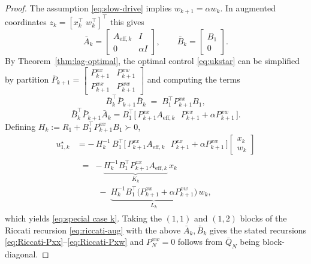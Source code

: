 \documentclass[letterpaper, 10 pt, conference]{ieeeconf}  %
\begin{document}
\begin{proof}
The assumption \eqref{eq:slow-drive} implies $w_{k+1}=\alpha w_k$. In augmented coordinates
$z_k=[x_k^\top \; w_k^\top]^\top$ this gives
\[
\bar A_k=\begin{bmatrix}A_{\mathrm{eff},k}& I\\ 0 & \alpha I\end{bmatrix},\qquad
\bar B_k=\begin{bmatrix}B_1\\ 0\end{bmatrix}.
\]
By Theorem~\ref{thm:lag-optimal}, the optimal control \eqref{eq:ukstar} can be simplified by partition $\bar P_{k+1}=\begin{bmatrix}P_{k+1}^{xx}&P_{k+1}^{xw}\\ P_{k+1}^{wx}&P_{k+1}^{ww}\end{bmatrix}$ and computing the terms
\begin{equation*}
\bar B_k^\top \bar P_{k+1}\bar B_k \;=\; B_1^\top P_{k+1}^{xx} B_1,
\end{equation*}
\begin{equation*}
\bar B_k^\top \bar P_{k+1}\bar A_k
= B_1^\top\!\big[\,P_{k+1}^{xx}A_{\mathrm{eff},k}\ \ \ P_{k+1}^{xx}+\alpha P_{k+1}^{xw}\,\big].
\end{equation*}
Defining $H_k := R_1 + B_1^\top P_{k+1}^{xx} B_1 \succ 0$, 
\begin{equation}
\begin{aligned}
u_{1,k}^\star
&= -\,H_k^{-1}\,B_1^\top\!\big[\,P_{k+1}^{xx}A_{\mathrm{eff},k}\ \ \ P_{k+1}^{xx}+\alpha P_{k+1}^{xw}\,\big]
\begin{bmatrix}x_k\\ w_k\end{bmatrix}\\[2pt]
&\;\begin{aligned}
= &-\,\underbrace{H_k^{-1}B_1^\top P_{k+1}^{xx}A_{\mathrm{eff},k}}_{\displaystyle K_k}\,x_k\\
&\;-\;\underbrace{H_k^{-1}B_1^\top\big(P_{k+1}^{xx}+\alpha P_{k+1}^{xw}\big)}_{\displaystyle L_k}\,w_k,
\end{aligned}
\end{aligned}
\end{equation}
which yields \eqref{eq:special case k}. Taking the $(1,1)$ and $(1,2)$ blocks of the Riccati recursion
\eqref{eq:riccati-aug} with the above $\bar A_k,\bar B_k$ gives the stated recursions
\eqref{eq:Riccati-Pxx}–\eqref{eq:Riccati-Pxw} and $P_N^{xw}=0$ follows from $\bar Q_N$ being block-diagonal.
\end{proof}
\end{document}
